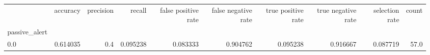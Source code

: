 \begin{tabular}{lrrrrrrrrr}
\toprule
{} &  accuracy &  precision &    recall &  false positive rate &  false negative rate &  true positive rate &  true negative rate &  selection rate &  count \\
passive\_alert &           &            &           &                      &                      &                     &                     &                 &        \\
\midrule
0.0           &  0.614035 &        0.4 &  0.095238 &             0.083333 &             0.904762 &            0.095238 &            0.916667 &        0.087719 &   57.0 \\
\bottomrule
\end{tabular}
